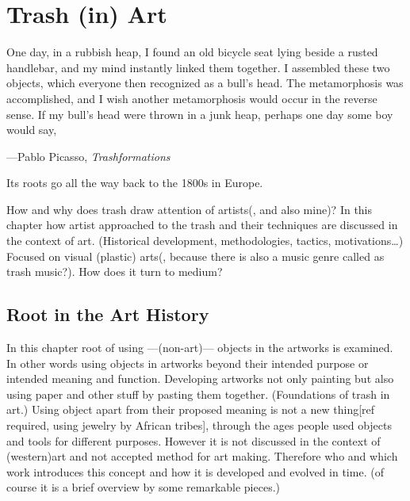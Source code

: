 \chapter{Trash (in) Art}

\epigraph{One day, in a rubbish heap, I found an old bicycle seat lying beside a rusted handlebar, and my mind instantly linked them together. I assembled these two objects, which everyone then recognized as a bull’s head. The metamorphosis was accomplished, and I wish another metamorphosis would occur in the reverse sense. If my bull’s head were thrown in a junk heap, perhaps one day some boy would say, }{\hfill ---Pablo Picasso, \textit{Trashformations}}


Its roots go all the way back to the 1800s in Europe.

How and why does trash draw attention of artists(, and also mine)? In this chapter how artist approached to the trash and their techniques are discussed in the context of art. (Historical development, methodologies, tactics, motivations\ldots) Focused on visual (plastic) arts(, because there is also a music genre called as trash music?). How does it turn to medium?



\section{Root in the Art History}
In this chapter root of using ---(non-art)--- objects in the artworks is examined. In other words using objects in artworks beyond their intended purpose or intended meaning and function. Developing artworks not only painting but also using paper and other stuff by pasting them together. (Foundations of trash in art.) Using object apart from their proposed meaning is not a new thing[ref required, using jewelry by African tribes], through the ages people used objects and tools for different purposes. However it is not discussed in the context of (western)art and not accepted method for art making. Therefore who and which work introduces this concept and how it is developed and evolved in time. (of course it is a brief overview by some remarkable pieces.)

